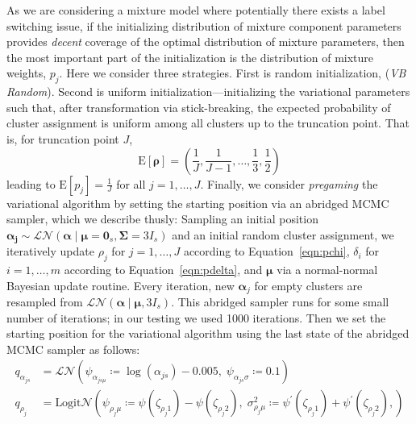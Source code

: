 
As we are considering a mixture model where potentially there exists a label switching
    issue, if the initializing distribution of mixture component parameters provides
    \emph{decent} coverage of the optimal distribution of mixture parameters, then the most 
    important part of the initialization is the distribution of mixture weights, $p_j$.  
    Here we consider three strategies.  First is random initialization,
    (\emph{VB Random}).  Second is uniform initialization---initializing the variational 
    parameters such that, after transformation via stick-breaking, the expected probability 
    of cluster assignment is uniform among all clusters up to the truncation point. That 
    is, for truncation point $J$,
    \[
        \text{E}[\bm{\rho}] = 
            \left(\frac{1}{J},\frac{1}{J-1},\ldots,\frac{1}{3},\frac{1}{2}\right)
    \]
    leading to $\text{E}[p_j] = \frac{1}{J}$ for all $j = 1,\ldots,J$.
    Finally, we consider \emph{pregaming} the variational algorithm by setting the starting 
    position via an abridged MCMC sampler, which we describe thusly:
    Sampling an initial position $\bm{\alpha_j} \sim 
        \mathcal{LN}(\bm{\alpha}\mid\bm{\mu} = \bm{0}_s,\bm{\Sigma} = 3I_s)$ and an
    initial random cluster assignment, we iteratively update $\rho_j$ for $j = 1,\ldots,J$
    according to Equation~\ref{eqn:pchi}, $\delta_i$ for $i = 1,\ldots,m$ according to
    Equation~\ref{eqn:pdelta}, and $\bm{\mu}$ via a normal-normal Bayesian update routine.
    Every iteration, new $\bm{\alpha}_j$ for empty clusters are resampled from 
    $\mathcal{LN}(\bm{\alpha}\mid\bm{\mu}, 3I_s)$.  
    This abridged sampler runs for some small number of iterations; in
    our testing we used 1000 iterations.  Then we set the starting position for the 
    variational algorithm using the last state of the abridged MCMC sampler as follows:
    \begin{equation}
        \begin{aligned}
        q_{\alpha_{js}} &= 
            \mathcal{LN}\left(\psi_{\alpha_{js\mu}} \coloneqq\log(\alpha_{js}) - 0.005,\; 
                \psi_{\alpha_{js}\sigma} \coloneqq0.1\right)\\
        q_{\rho_j} &= \text{Logit}\mathcal{N}\left(
        \psi_{\rho_j\mu} \coloneqq\psi(\zeta_{\rho_j 1}) - \psi(\zeta_{\rho_j 2}), \;
            \sigma_{\rho_j\mu}^2 \coloneqq\psi^{\prime}(\zeta_{\rho_j 1}) +
                \psi^{\prime}(\zeta_{\rho_j 2}),
            \right)
        \end{aligned}    
    \end{equation}
